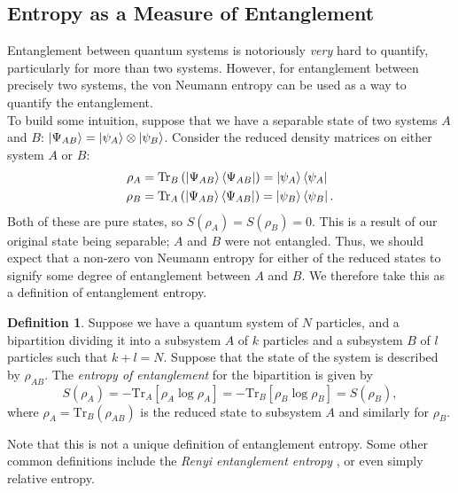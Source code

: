 \documentclass[12pt,a4paper]{report}
\numberwithin{equation}{section}
\newcommand{\ketbra}[2]{\ket{#1}\bra{#2}}
\newcommand{\ketbras}[1]{\ketbra{#1}{#1}}
\newcommand{\tr}{\text{Tr}}
\theoremstyle{definition}
\newtheorem{definition}{Definition}[section]
\theoremstyle{theorem}
\theoremstyle{theorem}
\theoremstyle{example}
\theoremstyle{definition}
\begin{document}
\subsection{Entropy as a Measure of Entanglement}
Entanglement between quantum systems is notoriously \textit{very} hard to quantify, particularly for more than two systems. However, for entanglement between precisely two systems, the von Neumann entropy can be used as a way to quantify the entanglement.\\
To build some intuition, suppose that we have a separable state of two systems $A$ and $B$: $\ket{\Psi_{AB}}=\ket{\psi_{A}}\otimes\ket{\psi_{B}}$. Consider the reduced density matrices on either system $A$ or $B$:
\begin{equation}
	\begin{aligned}
		\rho_{A}&=\tr_{B}\left(\ketbras{\Psi_{AB}}\right)=\ketbras{\psi_{A}}\\
		\rho_{B}&=\tr_{A}\left(\ketbras{\Psi_{AB}}\right)=\ketbras{\psi_{B}}.
	\end{aligned}
\end{equation}
Both of these are pure states, so $S(\rho_{A})=S(\rho_{B})=0$. This is a result of our original state being separable; $A$ and $B$ were not entangled. Thus, we should expect that a non-zero von Neumann entropy for either of the reduced states to signify some degree of entanglement between $A$ and $B$. We therefore take this as a definition of entanglement entropy.
\begin{definition}
	Suppose we have a quantum system of $N$ particles, and a bipartition dividing it into a subsystem $A$ of $k$ particles and a subsystem $B$ of $l$ particles such that $k+l=N$. Suppose that the state of the system is described by $\rho_{AB}$. The \textit{entropy of entanglement} for the bipartition is given by
	\begin{equation}
		S(\rho_{A})=-\tr_{A}\left[\rho_{A}\log\rho_{A}\right]=-\tr_{B}\left[\rho_{B}\log\rho_{B}\right]=S(\rho_{B}),
	\end{equation}
	where $\rho_{A}=\tr_{B}\left(\rho_{AB}\right)$ is the reduced state to subsystem $A$ and similarly for $\rho_{B}$.
\end{definition}
Note that this is not a unique definition of entanglement entropy. Some other common definitions include the \textit{Renyi entanglement entropy} \cite{Renyi}, or even simply relative entropy.
\end{document}
